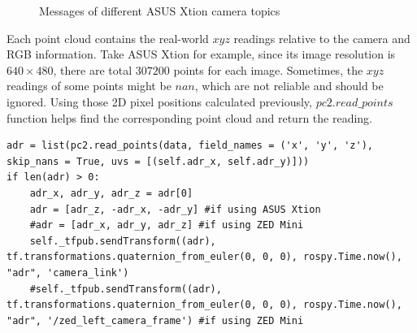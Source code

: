 \begin{figure}[H]
\centering
{}
\caption{Messages of different ASUS Xtion camera topics}
\end{figure}

Each point cloud contains the real-world $xyz$ readings relative to the camera and RGB information. Take ASUS Xtion for example, since its image resolution is $640 \times 480$, there are total $307200$ points for each image. Sometimes, the $xyz$ readings of some points might be $nan$, which are not reliable and should be ignored. Using those 2D pixel positions calculated previously, $pc2.read\_points$ function helps find the corresponding point cloud and return the reading.

\begin{verbatim}
adr = list(pc2.read_points(data, field_names = ('x', 'y', 'z'), skip_nans = True, uvs = [(self.adr_x, self.adr_y)]))
if len(adr) > 0:
    adr_x, adr_y, adr_z = adr[0]
    adr = [adr_z, -adr_x, -adr_y] #if using ASUS Xtion
    #adr = [adr_x, adr_y, adr_z] #if using ZED Mini
    self._tfpub.sendTransform((adr), tf.transformations.quaternion_from_euler(0, 0, 0), rospy.Time.now(), "adr", 'camera_link')
    #self._tfpub.sendTransform((adr), tf.transformations.quaternion_from_euler(0, 0, 0), rospy.Time.now(), "adr", '/zed_left_camera_frame') #if using ZED Mini
\end{verbatim}

